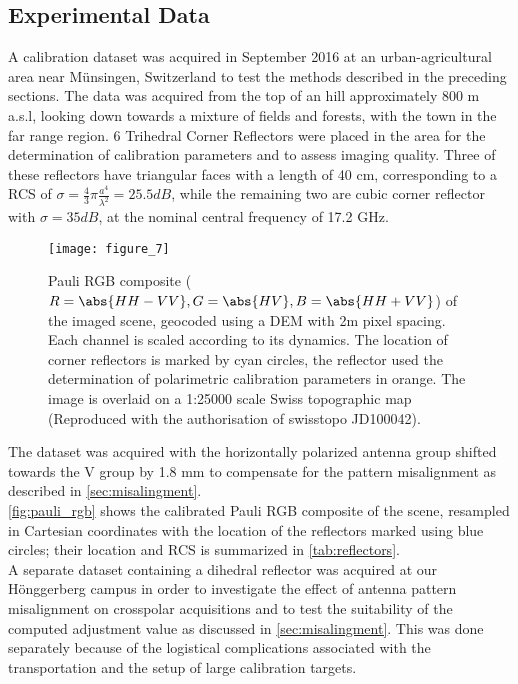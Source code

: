 \subsection{Experimental Data}\label{sec:data}
A calibration dataset was acquired in September 2016 at an urban-agricultural area near M\"{u}nsingen, Switzerland to test the methods described in the preceding sections. The data was acquired from the top of an hill approximately 800 m a.s.l, looking down towards a mixture of fields and forests, with the town in the far range region. 6 Trihedral Corner Reflectors were placed in the area for the determination of calibration parameters and to assess imaging quality. Three of these reflectors have triangular faces with a length of 40 cm, corresponding to a RCS of $\sigma=\frac{4}{3}\pi \frac{a^4}{\lambda^2}=25.5 dB$, while the remaining two are cubic corner reflector with $\sigma= 35 dB$, at the nominal central frequency of 17.2 GHz.
	\begin{figure*}
		\centering
		\texttt{[image: figure\_7]}
		\caption{Pauli RGB composite ($R=\abs{HH-VV},G=\abs{HV}, B=\abs{HH+VV}$) of the imaged scene, geocoded using a DEM with 2m pixel spacing. Each channel is scaled according to its dynamics. The location of corner reflectors is marked by cyan circles, the reflector used the determination of polarimetric calibration parameters in orange. The image is overlaid on a 1:25000 scale Swiss topographic map (Reproduced with the authorisation of swisstopo  JD100042).}
		\label{fig:pauli_rgb}
	\end{figure*}
The dataset was acquired with the horizontally polarized antenna group shifted towards the V group by 1.8 mm to compensate for the pattern misalignment as described in \autoref{sec:misalingment}.\\
\autoref{fig:pauli_rgb} shows the calibrated Pauli RGB composite of the scene, resampled in Cartesian coordinates with the location of the reflectors marked using blue circles; their location and RCS is summarized in \autoref{tab:reflectors}.\\
A separate dataset containing a dihedral reflector was acquired at our H\"{o}nggerberg campus in order to investigate the effect of antenna pattern misalignment on crosspolar acquisitions and to test the suitability of the computed adjustment value as discussed in \autoref{sec:misalingment}. This was done separately because of the logistical complications associated with the transportation and the setup of large calibration targets.


